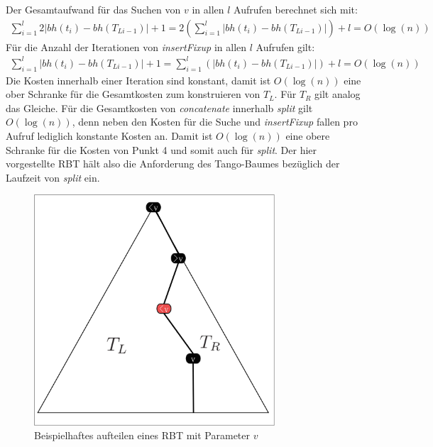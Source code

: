 \documentclass[a4paper,12pt]{article}
\begin{document}
\noindent Der Gesamtaufwand für das Suchen von $v$ in allen $l$ Aufrufen berechnet sich mit: 
\begin{align*}
 \sum_{i = 1}^{l}  2 \vert\mathit{bh}(t_{i}) -\mathit{bh}(T_{Li-1}) \vert + 1 =
2 \left( \sum_{i = 1}^{l}   \vert\mathit{bh}(t_{i}) -\mathit{bh}(T_{Li-1}) \vert \right)+ l
= O \left(\log \left(n \right) \right)
\end{align*}
\noindent Für die Anzahl der Iterationen von \textit{insertFixup} in allen $l$ Aufrufen gilt: 
\begin{align*}
\sum_{i = 1}^{l}   \vert\mathit{bh}(t_{i}) -\mathit{bh}(T_{Li-1}) \vert +1 =
\sum_{i = 1}^{l}  \left( \vert\mathit{bh}(t_{i}) -\mathit{bh}(T_{Li-1}) \vert \right) + l 
= O \left(\log \left(n \right) \right)
\end{align*}
Die Kosten innerhalb einer Iteration sind konstant, damit ist  $O \left(\log \left(n \right) \right)$ eine ober Schranke für die Gesamtkosten zum konstruieren von $T_L$. Für $T_R$ gilt analog das Gleiche. Für die Gesamtkosten von \textit{concatenate} innerhalb \textit{split} gilt $O \left(\log \left(n \right) \right)$, denn neben den Kosten für die Suche und \textit{insertFixup} fallen pro Aufruf lediglich konstante Kosten an. Damit ist $O \left(\log \left(n \right) \right)$ eine obere Schranke für die Kosten von Punkt 4 und somit auch für \textit{split}. Der hier vorgestellte RBT hält also die Anforderung des Tango-Baumes bezüglich der Laufzeit von \textit{split} ein.







\begin{figure}[h]
	\centering
	\includegraphics[width=0.8\textwidth]{"Medien/RotSchwarzBaum/aufteilen"}
	\caption{Beispielhaftes aufteilen eines RBT mit Parameter $v$ }
	\label{fig:aufteilen}
\end{figure}

\newpage


\end{document}
